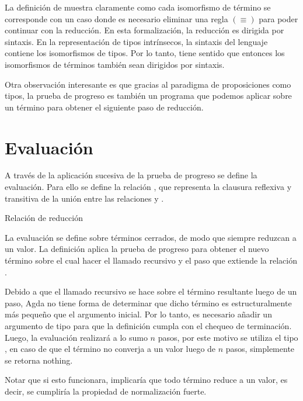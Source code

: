 \documentclass[]{report}
\begin{document}
	La definición de  muestra claramente como cada isomorfismo de término se corresponde con un caso donde es necesario eliminar una regla $(\equiv)$ para poder continuar con la reducción.
	En esta formalización, la reducción es dirigida por sintaxis.
	En la representación de tipos intrínsecos, la sintaxis del lenguaje contiene los isomorfismos de tipos.
	Por lo tanto, tiene sentido que entonces los isomorfismos de términos también sean dirigidos por sintaxis.
	
	Otra observación interesante es que gracias al paradigma de proposiciones como tipos, la prueba de progreso es también un programa que podemos aplicar sobre un término para obtener el siguiente paso de reducción.
	
	\section{Evaluación}
	
	A través de la aplicación sucesiva de la prueba de progreso se define la evaluación.
	Para ello se define la relación \AgdaDatatype{$\_\rightsquigarrow\_$}, que representa la clausura reflexiva y transitiva de la unión entre las relaciones \AgdaDatatype{$\_\hookrightarrow\_$} y \AgdaDatatype{$\_\rightleftarrows\_$}.
	
	\begin{codigo}
		Relación de reducción
	\end{codigo}
	
	La evaluación se define sobre términos cerrados, de modo que siempre reduzcan a un valor.
	La definición aplica la prueba de progreso para obtener el nuevo término sobre el cual hacer el llamado recursivo y el paso que extiende la relación \AgdaDatatype{$\_\rightsquigarrow\_$}.
	
	Debido a que el llamado recursivo se hace sobre el término resultante luego de un paso, Agda no tiene forma de determinar que dicho término es estructuralmente más pequeño que el argumento inicial.
	Por lo tanto, es necesario añadir un argumento de tipo  para que la definición cumpla con el chequeo de terminación.
	Luego, la evaluación realizará a lo sumo $n$ pasos, por este motivo se utiliza el tipo , en caso de que el término no converja a un valor luego de $n$ pasos, simplemente se retorna nothing.
	
	
	Notar que si esto funcionara, implicaría que todo término reduce a un valor, es decir, se cumpliría la propiedad de normalización fuerte.
	
\end{document}
